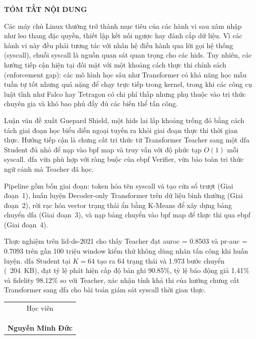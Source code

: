 \documentclass[../main.tex]{subfiles}
\begin{document}
\begin{center}
  \Large{\textbf{TÓM TẮT NỘI DUNG}}\\
\end{center}
\vspace{1cm}
Các máy chủ Linux thường trở thành mục tiêu của các hành vi sau xâm
nhập như leo thang đặc
quyền, thiết lập kết nối ngược hay đánh cắp dữ liệu. Vì các hành vi
này đều phải tương tác
với nhân hệ điều hành qua lời gọi hệ thống (\gls{syscall}), chuỗi \gls{syscall}
là nguồn quan sát quan
trọng cho các \gls{hids}. Tuy
nhiên, các hướng tiếp
cận hiện tại đối mặt với một khoảng cách thực thi chính sách
(enforcement gap): các mô hình
học sâu như Transformer có khả năng học mẫu tuần tự tốt nhưng quá
nặng để chạy trực tiếp
trong kernel, trong khi các công cụ luật tĩnh như Falco hay Tetragon
có chi phí thấp nhưng
phụ thuộc vào tri thức chuyên gia và khó bao phủ đầy đủ các biến thể tấn công.

Luận văn đề xuất Guepard Shield, một \gls{hids} lai lấp khoảng
trống đó bằng cách tách
giai đoạn học biểu diễn ngoại tuyến ra khỏi giai đoạn thực thi thời
gian thực. Hướng tiếp
cận là chưng cất tri thức từ Transformer Teacher sang một \gls{dfa}
Student đủ nhỏ để nạp vào \gls{bpf} map và truy vấn với độ phức tạp $O(1)$
mỗi \gls{syscall}. \Gls{dfa} vừa
phù hợp với ràng buộc của \gls{ebpf} Verifier, vừa bảo toàn tri thức ngữ
cảnh mà Teacher đã học.

Pipeline gồm bốn giai đoạn: token hóa tên \gls{syscall} và tạo cửa sổ trượt
(Giai đoạn~1),
huấn luyện Decoder-only Transformer trên dữ liệu bình thường (Giai
đoạn~2), rời rạc hóa
vector trạng thái ẩn bằng K-Means để xây dựng bảng chuyển \gls{dfa} (Giai
đoạn~3), và nạp bảng
chuyển vào \gls{bpf} map để thực thi qua \gls{ebpf} (Giai đoạn~4).

Thực nghiệm trên \gls{lid-ds}-2021 cho thấy Teacher đạt \gls{auroc} = 0.8503 và
\gls{pr-auc} = 0.7093 trên
gần 100 triệu window kiểm thử không dùng nhãn tấn công khi huấn
luyện. \Gls{dfa} Student tại
$K = 64$ tạo ra 64 trạng thái và 1.973 bước chuyển (~204~KB), đạt tỷ
lệ phát hiện cấp độ
bản ghi 90.85\%, tỷ lệ báo động giả 1.41\% và fidelity 98.12\% so với
Teacher, xác nhận
tính khả thi của hướng chưng cất Transformer sang \gls{dfa} cho bài toán
giám sát \gls{syscall}
thời gian thực.
\begin{flushright}
  \begin{tabular}{@{}c@{}}
    Học viên\\
    \\
    \\
    \\
    \textbf{Nguyễn Minh Đức}
  \end{tabular}
\end{flushright}
\end{document}
